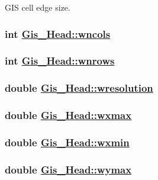GIS cell edge size. 

\hypertarget{structGis__Head_o15}{
\subsubsection[wncols]{\setlength{\rightskip}{0pt plus 5cm}int \hyperlink{structGis__Head_o15}{Gis\_\-Head::wncols}}}
\label{structGis__Head_o15}


\hypertarget{structGis__Head_o14}{
\subsubsection[wnrows]{\setlength{\rightskip}{0pt plus 5cm}int \hyperlink{structGis__Head_o14}{Gis\_\-Head::wnrows}}}
\label{structGis__Head_o14}


\hypertarget{structGis__Head_o13}{
\subsubsection[wresolution]{\setlength{\rightskip}{0pt plus 5cm}double \hyperlink{structGis__Head_o13}{Gis\_\-Head::wresolution}}}
\label{structGis__Head_o13}


\hypertarget{structGis__Head_o10}{
\subsubsection[wxmax]{\setlength{\rightskip}{0pt plus 5cm}double \hyperlink{structGis__Head_o10}{Gis\_\-Head::wxmax}}}
\label{structGis__Head_o10}


\hypertarget{structGis__Head_o9}{
\subsubsection[wxmin]{\setlength{\rightskip}{0pt plus 5cm}double \hyperlink{structGis__Head_o9}{Gis\_\-Head::wxmin}}}
\label{structGis__Head_o9}


\hypertarget{structGis__Head_o12}{
\subsubsection[wymax]{\setlength{\rightskip}{0pt plus 5cm}double \hyperlink{structGis__Head_o12}{Gis\_\-Head::wymax}}}
\label{structGis__Head_o12}


